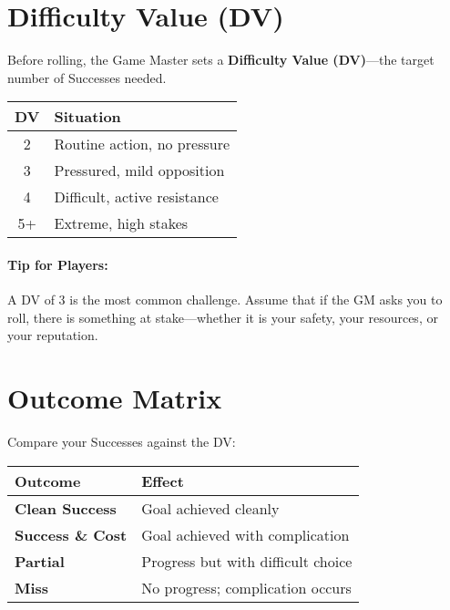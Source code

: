 \section{Difficulty Value (DV)} 

Before rolling, the Game Master sets a \textbf{Difficulty Value (DV)}—the target number of Successes needed.

\begin{center}
\small
\begin{tabular}{cl}
\toprule
\textbf{DV} & \textbf{Situation} \\
\midrule
2 & Routine action, no pressure \\
3 & Pressured, mild opposition \\
4 & Difficult, active resistance \\
5+ & Extreme, high stakes \\
\bottomrule
\end{tabular}
\end{center}

\paragraph{Tip for Players:} A DV of 3 is the most common challenge. Assume that if the GM asks you to roll, there is something at stake—whether it is your safety, your resources, or your reputation.

\section{Outcome Matrix} 

Compare your Successes against the DV:

\begin{center}
\small
\begin{tabular}{ll}
\toprule
\textbf{Outcome} & \textbf{Effect} \\
\midrule
\textbf{Clean Success}\index{Success!Clean} & Goal achieved cleanly \\
\textbf{Success \& Cost}\index{Success!with Cost} & Goal achieved with complication \\
\textbf{Partial}\index{Partial} & Progress but with difficult choice \\
\textbf{Miss}\index{Miss} & No progress; complication occurs \\
\bottomrule
\end{tabular}
\end{center}

